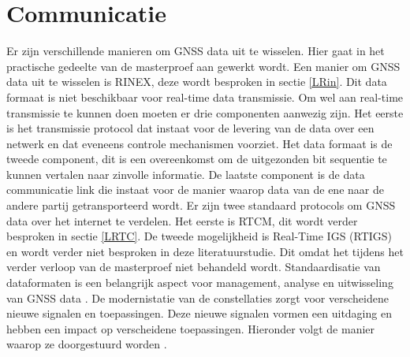 \section{Communicatie}
\label{LCom}
Er zijn verschillende manieren om GNSS data uit te wisselen. Hier gaat in het practische gedeelte van de masterproef aan gewerkt wordt.  Een manier om GNSS data uit te wisselen is RINEX, deze wordt besproken in sectie \ref{LRin}. Dit data formaat is niet beschikbaar voor real-time data transmissie. Om wel aan real-time transmissie te kunnen doen moeten er drie componenten aanwezig zijn. Het eerste is het transmissie protocol dat instaat voor de levering van de data over een netwerk en dat eveneens controle mechanismen voorziet. Het data formaat is de tweede component, dit is een overeenkomst om de uitgezonden bit sequentie te kunnen vertalen naar zinvolle informatie. De laatste component is de data communicatie link die instaat voor de manier waarop data van de ene naar de andere partij getransporteerd wordt. Er zijn twee standaard protocols om GNSS data over het internet te verdelen. Het eerste is RTCM, dit wordt verder besproken in sectie \ref{LRTC}. De tweede mogelijkheid is Real-Time IGS (RTIGS) \cite{LBibRTCM} en wordt verder niet besproken in deze literatuurstudie. Dit omdat het tijdens het verder verloop van de masterproef niet behandeld wordt. Standaardisatie van dataformaten is een belangrijk aspect voor management, analyse en uitwisseling van GNSS data \cite{LBibRINEX}. De modernistatie van de constellaties zorgt voor verscheidene nieuwe signalen en toepassingen. Deze nieuwe signalen vormen een uitdaging en hebben een impact op verscheidene toepassingen. Hieronder volgt de manier waarop ze doorgestuurd worden \cite{LBibRINEX2}. 

